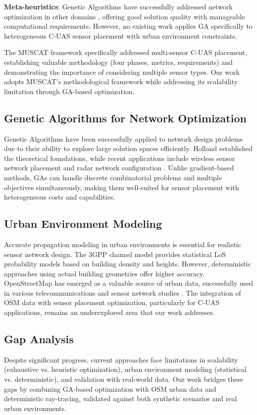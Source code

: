 \textbf{Meta-heuristics}: Genetic Algorithms have successfully addressed network optimization in other domains \cite{zou2019WSN, charlish2016radar}, offering good solution quality with manageable computational requirements. However, no existing work applies GA specifically to heterogeneous C-UAS sensor placement with urban environment constraints.

The MUSCAT framework \cite{muscat2023} specifically addressed multi-sensor C-UAS placement, establishing valuable methodology (four phases, metrics, requirements) and demonstrating the importance of considering multiple sensor types. Our work adopts MUSCAT's methodological framework while addressing its scalability limitation through GA-based optimization.

\subsection{Genetic Algorithms for Network Optimization}

Genetic Algorithms have been successfully applied to network design problems due to their ability to explore large solution spaces efficiently. Holland \cite{holland1992adaptation} established the theoretical foundations, while recent applications include wireless sensor network placement \cite{zou2019WSN} and radar network configuration \cite{charlish2016radar}. Unlike gradient-based methods, GAs can handle discrete combinatorial problems and multiple objectives simultaneously, making them well-suited for sensor placement with heterogeneous costs and capabilities.

\subsection{Urban Environment Modeling}

Accurate propagation modeling in urban environments is essential for realistic sensor network design. The 3GPP channel model \cite{3gpp38901} provides statistical LoS probability models based on building density and heights. However, deterministic approaches using actual building geometries offer higher accuracy. OpenStreetMap has emerged as a valuable source of urban data, successfully used in various telecommunications and sensor network studies \cite{osm_applications}. The integration of OSM data with sensor placement optimization, particularly for C-UAS applications, remains an underexplored area that our work addresses.

\subsection{Gap Analysis}

Despite significant progress, current approaches face limitations in scalability (exhaustive vs. heuristic optimization), urban environment modeling (statistical vs. deterministic), and validation with real-world data. Our work bridges these gaps by combining GA-based optimization with OSM urban data and deterministic ray-tracing, validated against both synthetic scenarios and real urban environments.

